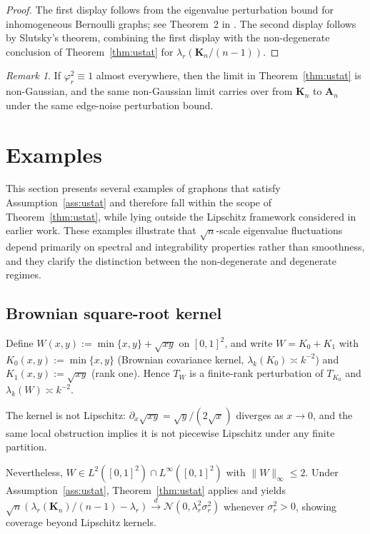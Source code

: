 \documentclass[11pt]{article}
\theoremstyle{plain}
\theoremstyle{remark}
\newtheorem{remark}[theorem]{Remark}
\begin{document}
\begin{proof}
The first display follows from the eigenvalue perturbation bound for inhomogeneous Bernoulli graphs; see Theorem~2 in \citet{aalipur2026bootstrap}.
The second display follows by Slutsky's theorem, combining the first display with the non-degenerate conclusion of Theorem~\ref{thm:ustat} for $\lambda_r(\mathbf{K}_n/(n-1))$.
\end{proof}


\begin{remark}
If $\varphi_r^2\equiv 1$ almost everywhere, then the limit in Theorem~\ref{thm:ustat} is non-Gaussian, and the same non-Gaussian limit carries over from $\mathbf{K}_n$ to $\mathbf{A}_n$ under the same edge-noise perturbation bound.
\end{remark}


\section{Examples}
\label{sec:examples}

This section presents several examples of graphons that satisfy Assumption~\ref{ass:ustat} and therefore fall within the scope of Theorem~\ref{thm:ustat}, while lying outside the Lipschitz framework considered in earlier work. These examples illustrate that $\sqrt{n}$-scale eigenvalue fluctuations depend primarily on spectral and integrability properties rather than smoothness, and they clarify the distinction between the non-degenerate and degenerate regimes.

\subsection{Brownian square-root kernel}

Define $W(x,y):=\min\{x,y\}+\sqrt{xy}$ on $[0,1]^2$, and write $W=K_0+K_1$ with
$K_0(x,y):=\min\{x,y\}$ (Brownian covariance kernel, $\lambda_k(K_0)\asymp k^{-2}$)
and $K_1(x,y):=\sqrt{xy}$ (rank one). Hence $T_W$ is a finite-rank perturbation of
$T_{K_0}$ and $\lambda_k(W)\asymp k^{-2}$.

The kernel is not Lipschitz: $\partial_x\sqrt{xy}=\sqrt{y}/(2\sqrt{x})$ diverges as
$x\to0$, and the same local obstruction implies it is not piecewise Lipschitz under
any finite partition.

Nevertheless, $W\in L^2([0,1]^2)\cap L^\infty([0,1]^2)$ with $\|W\|_\infty\le2$.
Under Assumption~\ref{ass:ustat}, Theorem~\ref{thm:ustat} applies and yields
$\sqrt{n}(\lambda_r(\mathbf{K}_n)/(n-1)-\lambda_r)\xrightarrow{d}\mathcal{N}(0,\lambda_r^2\sigma_r^2)$
whenever $\sigma_r^2>0$, showing coverage beyond Lipschitz kernels.
\end{document}
